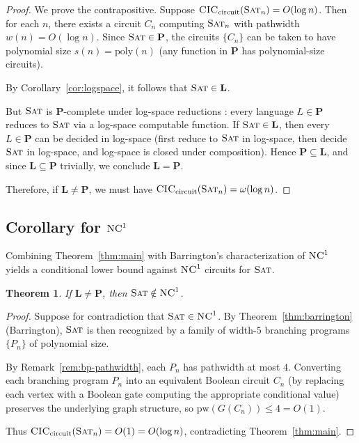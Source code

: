 \documentclass[11pt]{article}
\newtheorem{theorem}{Theorem}
\newcommand{\SAT}{\textsc{Sat}}
\newcommand{\CIC}{\textsc{CIC}}
\newcommand{\pw}{\mathrm{pw}}
\newcommand{\poly}{\mathrm{poly}}
\newcommand{\NC}{\textsc{NC}}
\begin{document}
\begin{proof}
  We prove the contrapositive.  Suppose
  $\CIC_{\text{circuit}}(\SAT_n) = O(\log n)$.  Then for each $n$, there
  exists a circuit $C_n$ computing $\SAT_n$ with pathwidth $w(n) = O(\log n)$.
  Since $\SAT \in \mathbf{P}$, the circuits $\{C_n\}$ can be taken to have
  polynomial size $s(n) = \poly(n)$ (any function in $\mathbf{P}$ has
  polynomial-size circuits).

  By Corollary~\ref{cor:logspace}, it follows that $\SAT \in \mathbf{L}$.

  But $\SAT$ is $\mathbf{P}$-complete under log-space reductions
  \cite{Lad75}: every language $L \in \mathbf{P}$ reduces to $\SAT$ via a
  log-space computable function.  If $\SAT \in \mathbf{L}$, then every
  $L \in \mathbf{P}$ can be decided in log-space (first reduce to $\SAT$ in
  log-space, then decide $\SAT$ in log-space, and log-space is closed under
  composition).  Hence $\mathbf{P} \subseteq \mathbf{L}$, and since
  $\mathbf{L} \subseteq \mathbf{P}$ trivially, we conclude
  $\mathbf{L} = \mathbf{P}$.

  Therefore, if $\mathbf{L} \neq \mathbf{P}$, we must have
  $\CIC_{\text{circuit}}(\SAT_n) = \omega(\log n)$.
\end{proof}

\subsection{Corollary for $\NC^1$}

Combining Theorem~\ref{thm:main} with Barrington's characterization of
$\NC^1$ yields a conditional lower bound against $\NC^1$ circuits for
$\SAT$.

\begin{theorem}
  \label{thm:nc1}
  If $\mathbf{L} \neq \mathbf{P}$, then $\SAT \notin \NC^1$.
\end{theorem}

\begin{proof}
  Suppose for contradiction that $\SAT \in \NC^1$.  By
  Theorem~\ref{thm:barrington} (Barrington), $\SAT$ is then recognized by a
  family of width-$5$ branching programs $\{P_n\}$ of polynomial size.

  By Remark~\ref{rem:bp-pathwidth}, each $P_n$ has pathwidth at most $4$.
  Converting each branching program $P_n$ into an equivalent Boolean circuit
  $C_n$ (by replacing each vertex with a Boolean gate computing the
  appropriate conditional value) preserves the underlying graph structure,
  so $\pw(G(C_n)) \leq 4 = O(1)$.

  Thus $\CIC_{\text{circuit}}(\SAT_n) = O(1) = O(\log n)$, contradicting
  Theorem~\ref{thm:main}.
\end{proof}
\end{document}
